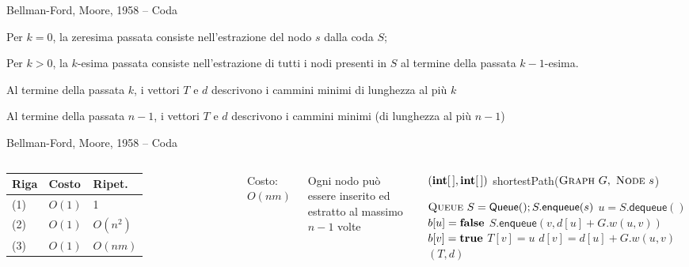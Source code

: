 \begin{frame}{Bellman-Ford, Moore, 1958 -- Coda}

\BIL
\item Per $k=0$, la zeresima passata consiste nell'estrazione del nodo $s$ dalla coda $S$;
\item Per $k>0$, la $k$-esima passata consiste nell'estrazione di tutti i nodi 
presenti in $S$ al termine della passata $k-1$-esima.
\EIL

\BIL
\item Al termine della passata $k$, i vettori $T$ e $d$ descrivono i cammini minimi di
lunghezza al più $k$ 
\item Al termine della passata $n-1$, i vettori $T$ e $d$ descrivono i cammini minimi
(di lunghezza al più $n-1$)
\EIL

\end{frame}

\begin{frame}{Bellman-Ford, Moore, 1958 -- Coda}



\begin{columns}

\begingroup
\renewcommand*{\arraystretch}{1.2}
\begin{tabular}{|l|l|l|}
\hline
Riga & Costo & Ripet. \\\hline
(1) & $O(1)$ & 1 \\\hline
(2) & $O(1)$ & $O(n^2)$ \\\hline
(3) & $O(1)$ & $O(nm)$ \\\hline
\end{tabular}
\endgroup

\medskip
Costo: \alert{$O(nm)$}

\medskip
Ogni nodo può essere inserito ed estratto al massimo $n-1$ volte

\vspace{-12pt}
\tiny
\begin{Procedure}
\caption[A]{$(\INTARRAY, \INTARRAY)$ \textsf{shortestPath}($\textsc{Graph}\ G,\ \textsc{Node}\ s$)}
\alert{$\textsc{Queue}\ S = \textsf{Queue}(); S.\textsf{enqueue}(s)$}\;
{
  \alert{$u = S.\textsf{dequeue}()$}\;
  $b[u] = \FALSE$\;
  {
    {
      {
        \alert{$S.\textsf{enqueue}(v, d[u]+G.w(u,v))$}\;
        $b[v] = \TRUE$\;
      }
      $T[v] = u$\;
      $d[v] = d[u] + G.w(u,v)$\;
    }
  }
}
\Return $(T,d)$
\end{Procedure}
\end{columns}

\end{frame}

